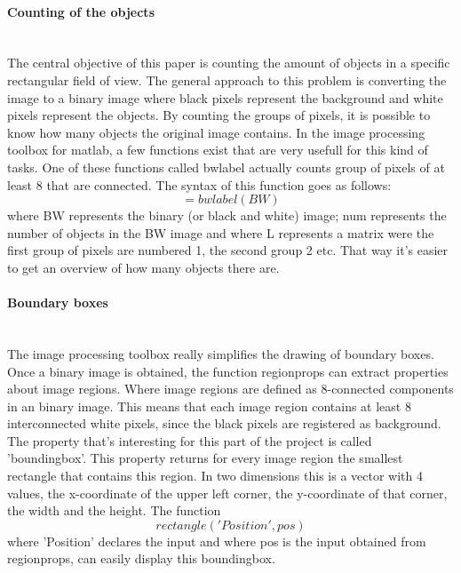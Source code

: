 \documentclass{article}
\begin{document}
\paragraph{Counting of the objects}\mbox{}\\
The central objective of this paper is counting the amount of objects in a specific rectangular field of view. The general approach to this problem is converting the image to a binary image where black pixels represent the background and white pixels represent the objects. By counting the groups of pixels, it is possible to know how many objects the original image contains. In the image processing toolbox for matlab\cite{Mathworks}, a few functions exist that are very usefull for this kind of tasks. One of these functions called bwlabel actually counts group of pixels of at least 8 that are connected. The syntax of this function goes as follows: 
\begin{equation}
[L, num] = bwlabel(BW)
\end{equation}
where BW represents the binary (or black and white) image; num represents the number of objects in the BW image and where L represents a matrix were the first group of pixels are numbered 1, the second group 2 etc. That way it’s easier to get an overview of how many objects there are.

\paragraph{Boundary boxes}\mbox{}\\
The image processing toolbox really simplifies the drawing of boundary boxes. Once a binary image is obtained, the function regionprops \cite{Mathworks} can extract properties about image regions. Where image regions are defined as 8-connected components in an binary image. This means that each image region contains at least 8 interconnected white pixels, since the black pixels are registered as background. The property that's interesting for this part of the project is called 'boundingbox'. This property returns for every image region the smallest rectangle that contains this region. In two dimensions this is a vector with 4 values, the x-coordinate of the upper left corner, the y-coordinate of that corner, the width and the height. The function 
\begin{equation}
rectangle('Position', pos)
\end{equation}
where 'Position' declares the input and where pos is the input obtained from regionprops, can easily display this boundingbox. 
\end{document}
